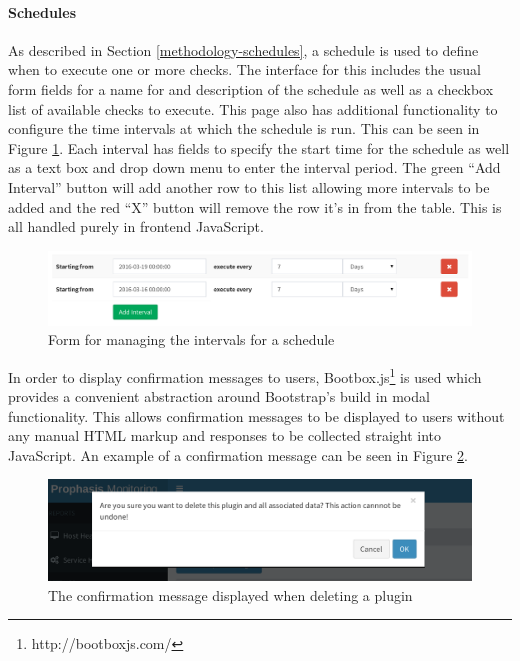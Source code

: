 \documentclass[bsc,deptreport,twoside,parskip,singlespacing,notimes]{infthesis}
\begin{document}
\paragraph*{Schedules}
	As described in Section \ref{methodology-schedules}, a schedule is used to
	define when to execute one or more checks.  The interface for this includes the
	usual form fields for a name for and description of the schedule as well as a
	checkbox list of available checks to execute.  This page also has additional
	functionality to configure the time intervals at which the schedule is run. This
	can be seen in Figure \ref{schedule-intervals}.  Each interval has fields to
	specify the start time for the schedule as well as a text box and drop down menu
	to enter the interval period.  The green ``Add Interval'' button will add another
	row to this list allowing more intervals to be added and the red ``X'' button will
	remove the row it's in from the table.  This is all handled purely in frontend
	JavaScript.

\begin{figure}[H]
	\caption{Form for managing the intervals for a schedule}
	\label{schedule-intervals}
	\includegraphics[scale=0.54]{assets/screenshots/schedule-intervals.pdf}
\end{figure}


	In order to display confirmation messages to users,
	Bootbox.js\footnote{http://bootboxjs.com/} is used which provides a convenient
	abstraction around Bootstrap's build in modal functionality.  This allows
	confirmation messages to be displayed to users without any manual HTML markup
	and responses to be collected straight into JavaScript.  An example of a
	confirmation message can be seen in Figure \ref{bootbox-delete}.

\begin{figure}[H]
	\centering
	\caption{The confirmation message displayed when deleting a plugin}
	\label{bootbox-delete}
	\includegraphics[scale=0.6]{assets/screenshots/bootbox-delete.pdf}
\end{figure}
\end{document}

